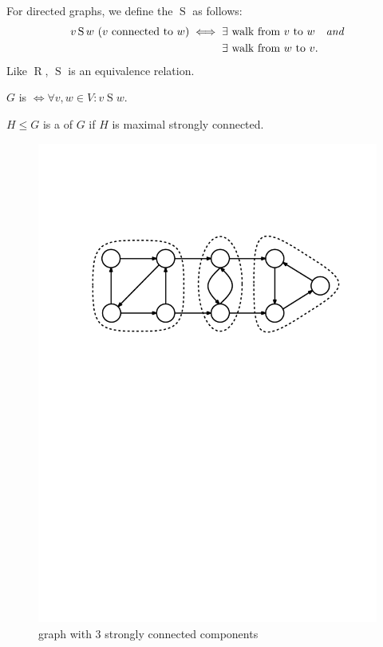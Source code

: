\begin{definition}
For directed graphs, we define the  $\operatorname{S}$ as follows:
\begin{align*}
v \operatorname{S} w \text{ ($v$ connected to $w$)} \iff \null
&\text{$\exists$ walk from $v$ to $w$\quad\emph{and}} \\
&\text{$\exists$ walk from $w$ to $v$.}
\end{align*}
Like $\operatorname{R}$, $\operatorname{S}$ is an equivalence relation.
\end{definition}

\begin{definition}
$G$ is  $\iff \forall v,w\in V: v \operatorname{S} w$.
\end{definition}

\begin{definition}
$H\leq G$ is a  of $G$ if $H$ is maximal strongly connected.
\end{definition}

\begin{figure}[htb]
	\centering
	\includegraphics[scale=.5]{01_graph_theory/pics/strongly-connected_component.pdf}
	\caption{graph with 3 strongly connected components}
\end{figure}
\FloatBarrier

